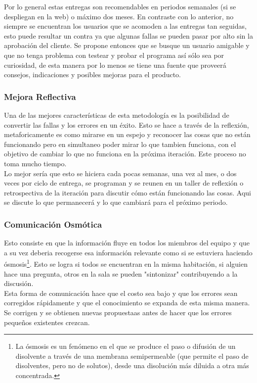 Por lo general estas entregas son recomendables en periodos semanales (si se despliegan en la web) o máximo dos meses. En contraste con lo anterior, no siempre se encuentran los usuarios que se acomoden a las entregas tan seguidas, esto puede resultar un contra ya que algunas fallas se pueden pasar por alto sin la aprobación del cliente. Se propone entonces que se busque un usuario amigable y que no tenga problema con testear y probar el programa así sólo sea por curiosidad, de esta manera por lo menos se tiene una fuente que proveerá consejos, indicaciones y posibles mejoras para el producto.

\subsubsection{Mejora Reflectiva}
Una de las mejores características de esta metodología es la posibilidad de convertir las fallas y los errores en un éxito. Esto se hace a través de la reflexión, metaforicamente es como mirarse en un espejo y reconocer las cosas que no están funcionando pero en simultaneo poder mirar lo que tambien funciona, con el objetivo de cambiar lo que no funciona en la próxima iteración. Este proceso no toma mucho tiempo.\\

Lo mejor sería que esto se hiciera cada pocas semanas, una vez al mes, o dos veces por ciclo de entrega, se programan y se reunen en un taller de reflexión o retrospectiva de la iteración para discutir cómo están funcionando las cosas. Aqui se discute lo que permanecerá y lo que cambiará para el próximo periodo. 

\subsubsection{Comunicación Osmótica}
Esto consiste en que la información fluye en todos los miembros del equipo y que a su vez deberia recogerse esa información relevante como si se estuviera haciendo ósmosis\footnote{La ósmosis es un fenómeno en el que se produce el paso o difusión de un disolvente a través de una membrana semipermeable (que permite el paso de disolventes, pero no de solutos), desde una disolución más diluida a otra más concentrada.}. Esto se logra si todos se encuentran en la misma habitación, si alguien hace una pregunta, otros en la sala se pueden "sintonizar" contribuyendo a la discusión.\\

Esta forma de comunicación hace que el costo sea bajo y que los errores sean corregidos rápidamente y que el conocimiento se expanda de esta misma manera. Se corrigen y se obtienen nuevas propuestaas antes de hacer que los errores pequeños existentes crezcan.


